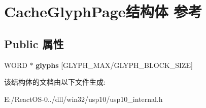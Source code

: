 \hypertarget{struct_cache_glyph_page}{}\section{Cache\+Glyph\+Page结构体 参考}
\label{struct_cache_glyph_page}
\subsection*{Public 属性}
\begin{DoxyCompactItemize}
\item 
\mbox{\label{struct_cache_glyph_page_a6324d17d8124893a516044e531d1a9c7}} 
W\+O\+RD $\ast$ {\bfseries glyphs} \mbox{[}G\+L\+Y\+P\+H\+\_\+\+M\+AX/G\+L\+Y\+P\+H\+\_\+\+B\+L\+O\+C\+K\+\_\+\+S\+I\+ZE\mbox{]}
\end{DoxyCompactItemize}


该结构体的文档由以下文件生成\+:\begin{DoxyCompactItemize}
\item 
E\+:/\+React\+O\+S-\/0../dll/win32/usp10/usp10\+\_\+internal.\+h\end{DoxyCompactItemize}

